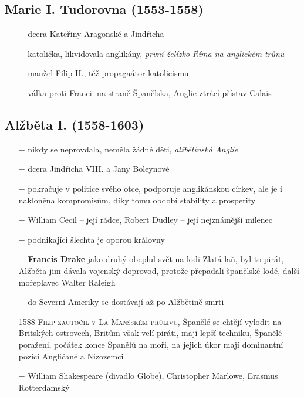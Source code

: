 \documentclass{article}
\begin{document}
\subsection*{Marie I. Tudorovna (1553-1558)}
\begin{itemize}
    \vspace{-0.5em}
    \setlength\itemsep{0.15em}
    \item[$-$] dcera Kateřiny Aragonské a Jindřicha
    \item[$-$] katolička, likvidovala anglikány, \textit{první želízko Říma na anglickém trůnu}
    \item[$-$] manžel Filip II., též propagaátor katolicismu
    \item[$-$] válka proti Francii na straně Španělska, Anglie ztrácí přístav Calais
\end{itemize}

\subsection*{Alžběta I. (1558-1603)}
\begin{itemize}
    \vspace{-0.5em}
    \setlength\itemsep{0.15em}
    \item[$-$] nikdy se neprovdala, neměla žádné děti, \textit{alžbětínská Anglie}
    \item[$-$] dcera Jindřicha VIII. a Jany Boleynové
    \item[$-$] pokračuje v politice svého otce, podporuje anglikánskou církev, ale je i nakloněna kompromisům, díky tomu období stability a prosperity
    \item[$-$] William Cecil -- její rádce, Robert Dudley -- její nejznámější milenec
    \item[$-$] podnikající šlechta je oporou královny
    \item[$-$] \textbf{Francis Drake} jako druhý obeplul svět na lodi Zlatá laň, byl to pirát, Alžběta jim dávala vojenský doprovod, protože přepadali španělské lodě, další mořeplavec Walter Raleigh
    \item[$-$] do Severní Ameriky se dostávají až po Alžbětině smrti
    \item[1588] \textsc{Filip zaútočil v La Manšském průlivu}, Španělé se chtějí vylodit na Britských ostrovech, Britům však velí piráti, mají lepší techniku, Španělé poraženi, počátek konce Španělů na moři, na jejich úkor mají dominantní pozici Angličané a Nizozemci
    \item[$-$] William Shakespeare (divadlo Globe), Christopher Marlowe, Erasmus Rotterdamský
\end{itemize}
\end{document}
